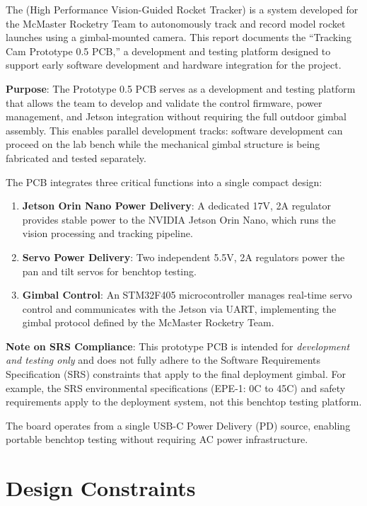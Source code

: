 \documentclass[12pt, titlepage]{article}
\begin{document}
The \progname{} (High Performance Vision-Guided Rocket Tracker) is a system
developed for the McMaster Rocketry Team to autonomously track and record model
rocket launches using a gimbal-mounted camera. This report documents the
``Tracking Cam Prototype 0.5 PCB,'' a development and testing platform designed
to support early software development and hardware integration for the
\progname{} project.

\textbf{Purpose}: The Prototype 0.5 PCB serves as a development and testing
platform that allows the team to develop and validate the control firmware,
power management, and Jetson integration without requiring the full outdoor
gimbal assembly. This enables parallel development tracks: software
development can proceed on the lab bench while the mechanical gimbal
structure is being fabricated and tested separately.

The PCB integrates three critical functions into a single compact design:

\begin{enumerate}[leftmargin=*]
  \item \textbf{Jetson Orin Nano Power Delivery}: A dedicated 17V, 2A
        regulator provides stable power to the NVIDIA Jetson Orin Nano,
        which runs the vision processing and tracking pipeline.
  \item \textbf{Servo Power Delivery}: Two independent 5.5V, 2A regulators
        power the pan and tilt servos for benchtop testing.
  \item \textbf{Gimbal Control}: An STM32F405 microcontroller manages
        real-time servo control and communicates with the Jetson via UART,
        implementing the gimbal protocol defined by the McMaster
        Rocketry Team.
\end{enumerate}

\textbf{Note on SRS Compliance}: This prototype PCB is intended for
\emph{development and testing only} and does not fully adhere to the
Software Requirements Specification (SRS) constraints that apply to the
final deployment gimbal. For example, the SRS environmental specifications
(EPE-1: 0\degree C to 45\degree C) and safety requirements apply to the
deployment system, not this benchtop testing platform.

The board operates from a single USB-C Power Delivery (PD) source, enabling
portable benchtop testing without requiring AC power infrastructure.

\section{Design Constraints}
\label{sec:constraints}
\end{document}
